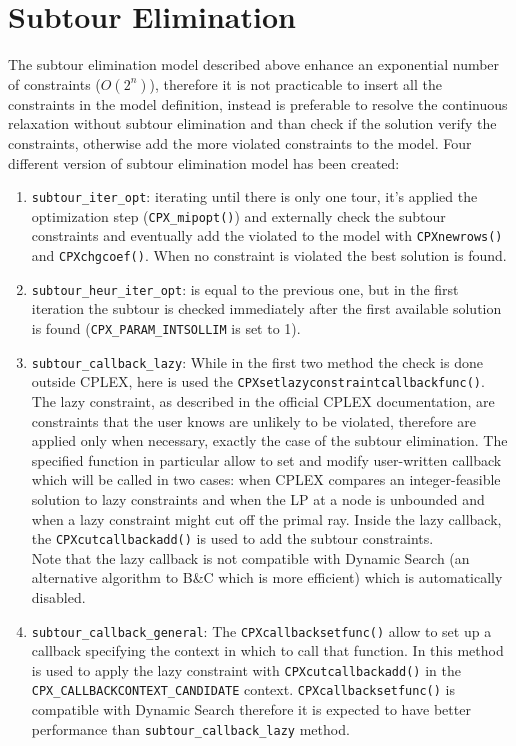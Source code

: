 \section{Subtour Elimination}\label{sec:subtour}
The subtour elimination model described above enhance an exponential number of constraints ($ O(2^n) $), therefore it is not practicable to insert all the constraints in the model definition, instead is preferable to resolve the continuous relaxation without subtour elimination and than check if the solution verify the constraints, otherwise add the more violated constraints to the model. Four different version of subtour elimination model has been created:
\begin{enumerate}
	\item \texttt{subtour\_iter\_opt}: iterating until there is only one tour, it's applied the optimization step (\texttt{CPX\_mipopt()}) and externally check the subtour constraints and eventually add the violated to the model with \texttt{CPXnewrows()} and \texttt{CPXchgcoef()}. When no constraint is violated the best solution is found.
	\item \texttt{subtour\_heur\_iter\_opt}: is equal to the previous one, but in the first iteration the subtour is checked immediately after the first available solution is found (\texttt{CPX\_PARAM\_INTSOLLIM} is set to 1). 
	\item \texttt{subtour\_callback\_lazy}: While in the first two method the check is done outside CPLEX, here is used the \texttt{CPXsetlazyconstraintcallbackfunc()}. The lazy constraint, as described in the official CPLEX documentation, are constraints that the user knows are unlikely to be violated, therefore are applied only when necessary, exactly the case of the subtour elimination. The specified function in particular allow to set and modify user-written callback which will be called in two cases: when CPLEX compares an integer-feasible solution to lazy constraints and when the LP at a node is unbounded and when a lazy constraint might cut off the primal ray. Inside the lazy callback, the \texttt{CPXcutcallbackadd()} is used to add the subtour constraints. \\ Note that the lazy callback is not compatible with Dynamic Search (an alternative algorithm to B\&C which is more efficient) which is automatically disabled.
	\item \texttt{subtour\_callback\_general}: The \texttt{CPXcallbacksetfunc()} allow to set up a callback specifying the context in which to call that function. In this method is used to apply the lazy constraint with \texttt{CPXcutcallbackadd()} in the \texttt{CPX\_CALLBACKCONTEXT\_CANDIDATE} context. \texttt{CPXcallbacksetfunc()} is compatible with Dynamic Search therefore it is expected to have better performance than \texttt{subtour\_callback\_lazy} method.
\end{enumerate} 

